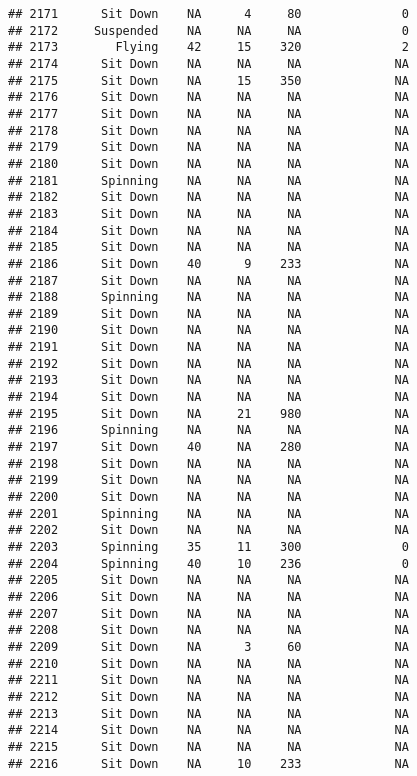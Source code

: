 \documentclass[
]{article}
\begin{document}
\begin{verbatim}
## 2171      Sit Down    NA      4     80              0
## 2172     Suspended    NA     NA     NA              0
## 2173        Flying    42     15    320              2
## 2174      Sit Down    NA     NA     NA             NA
## 2175      Sit Down    NA     15    350             NA
## 2176      Sit Down    NA     NA     NA             NA
## 2177      Sit Down    NA     NA     NA             NA
## 2178      Sit Down    NA     NA     NA             NA
## 2179      Sit Down    NA     NA     NA             NA
## 2180      Sit Down    NA     NA     NA             NA
## 2181      Spinning    NA     NA     NA             NA
## 2182      Sit Down    NA     NA     NA             NA
## 2183      Sit Down    NA     NA     NA             NA
## 2184      Sit Down    NA     NA     NA             NA
## 2185      Sit Down    NA     NA     NA             NA
## 2186      Sit Down    40      9    233             NA
## 2187      Sit Down    NA     NA     NA             NA
## 2188      Spinning    NA     NA     NA             NA
## 2189      Sit Down    NA     NA     NA             NA
## 2190      Sit Down    NA     NA     NA             NA
## 2191      Sit Down    NA     NA     NA             NA
## 2192      Sit Down    NA     NA     NA             NA
## 2193      Sit Down    NA     NA     NA             NA
## 2194      Sit Down    NA     NA     NA             NA
## 2195      Sit Down    NA     21    980             NA
## 2196      Spinning    NA     NA     NA             NA
## 2197      Sit Down    40     NA    280             NA
## 2198      Sit Down    NA     NA     NA             NA
## 2199      Sit Down    NA     NA     NA             NA
## 2200      Sit Down    NA     NA     NA             NA
## 2201      Spinning    NA     NA     NA             NA
## 2202      Sit Down    NA     NA     NA             NA
## 2203      Spinning    35     11    300              0
## 2204      Spinning    40     10    236              0
## 2205      Sit Down    NA     NA     NA             NA
## 2206      Sit Down    NA     NA     NA             NA
## 2207      Sit Down    NA     NA     NA             NA
## 2208      Sit Down    NA     NA     NA             NA
## 2209      Sit Down    NA      3     60             NA
## 2210      Sit Down    NA     NA     NA             NA
## 2211      Sit Down    NA     NA     NA             NA
## 2212      Sit Down    NA     NA     NA             NA
## 2213      Sit Down    NA     NA     NA             NA
## 2214      Sit Down    NA     NA     NA             NA
## 2215      Sit Down    NA     NA     NA             NA
## 2216      Sit Down    NA     10    233             NA

\end{verbatim}
\end{document}
